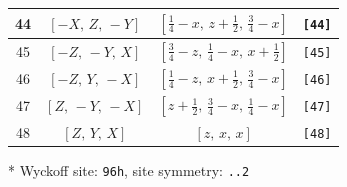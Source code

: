 \documentclass[fleqn,8pt]{jsarticle}
\begin{document}
\begin{longtable}{cccc}
44 & $\left[ - X,\, Z,\, - Y \right]$ & $\left[ \frac{1}{4} - x,\, z + \frac{1}{2},\, \frac{3}{4} - x \right]$ & {\tt [44]} \\ \hline
45 & $\left[ - Z,\, - Y,\, X \right]$ & $\left[ \frac{3}{4} - z,\, \frac{1}{4} - x,\, x + \frac{1}{2} \right]$ & {\tt [45]} \\ \hline
46 & $\left[ - Z,\, Y,\, - X \right]$ & $\left[ \frac{1}{4} - z,\, x + \frac{1}{2},\, \frac{3}{4} - x \right]$ & {\tt [46]} \\ \hline
47 & $\left[ Z,\, - Y,\, - X \right]$ & $\left[ z + \frac{1}{2},\, \frac{3}{4} - x,\, \frac{1}{4} - x \right]$ & {\tt [47]} \\ \hline
48 & $\left[ Z,\, Y,\, X \right]$ & $\left[ z,\, x,\, x \right]$ & {\tt [48]} \\
\end{longtable}
* Wyckoff site: {\tt 96h}, site symmetry: {\tt ..2}
\renewcommand{\arraystretch}{1.2}
\end{document}
